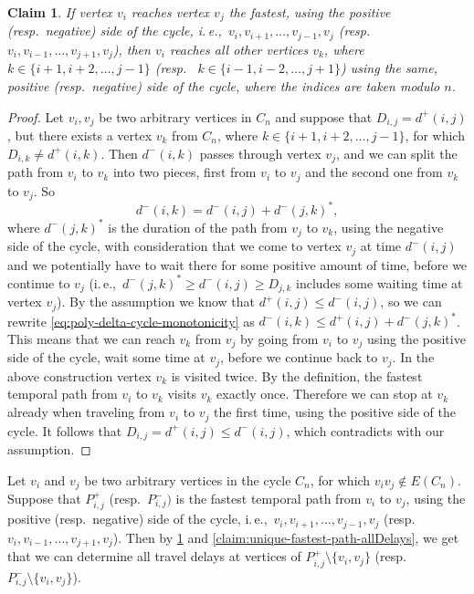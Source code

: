 \documentclass[11pt,a4paper]{article}
\newtheorem{claim}[theorem]{Claim}
\theoremstyle{remark}
\theoremstyle{definition}
\newcommand{\ie}{i.\,e.,\ }
\begin{document}
\begin{claim} \label{claim:poly-delta-cycle-monotonicity}
    If vertex $v_i$ reaches vertex $v_j$ the fastest, using the positive (resp.~negative) side of the cycle, \ie $v_i, v_{i+1}, \dots, v_{j-1}, v_j$ (resp. $v_i, v_{i-1}, \dots, v_{j+1}, v_j$),
    then $v_i$ reaches all other vertices $v_k$, where $k \in \{i+1, i+2, \dots, j-1\}$ (resp.~ $k \in \{i-1, i-2, \dots, j+1\}$)
    using the same, positive (resp.~negative) side of the cycle,
    where the indices are taken modulo $n$.
\end{claim}
\begin{proof}
    Let $v_i, v_j$ be two arbitrary vertices in $C_n$ and suppose that $D_{i,j} = d^+(i,j)$,
    but there exists a vertex $v_k$ from $C_n$, where $k \in \{i+1, i+2, \dots, j-1\}$,
    for which $D_{i,k} \neq d^+(i,k)$.
    Then $d^-(i,k)$ passes through vertex $v_j$, and we can split the path from $v_i$ to $v_k$ into two pieces, 
    first from $v_i$ to $v_j$ and the second one from $v_k$ to $v_j$.
    So 
    \begin{equation} \label{eq:poly-delta-cycle-monotonicity}
        d^-(i,k) = d^-(i,j) + d^-(j,k)^*,
    \end{equation} where $d^-(j,k)^*$ is the duration of the path from $v_j$ to $v_k$, using the negative side of the cycle, with consideration that we come to vertex $v_j$ at time $d^-(i,j)$ and we potentially have to wait there for some positive amount of time, before we continue to $v_j$
    (\ie $d^-(j,k)^* \geq d^-(i,j) \geq D_{j,k}$ includes some waiting time at vertex $v_j$).
    By the assumption we know that $d^+(i,j) \leq d^-(i,j)$, so we can rewrite \cref{eq:poly-delta-cycle-monotonicity} as
    $d^-(i,k) \leq d^+(i,j) + d^-(j,k)^*$. This means that we can reach $v_k$ from $v_j$ by going from $v_i$ to $v_j$ using the positive side of the cycle, wait some time at $v_j$, before we continue back to $v_j$.
    In the above construction vertex $v_k$ is visited twice. By the definition, the fastest temporal path from $v_i$ to $v_k$ visits $v_k$ exactly once. Therefore we can stop at $v_k$ already when traveling from $v_i$ to $v_j$ the first time, using the positive side of the cycle.
    It follows that $D_{i,j} = d^+(i,j) \leq d^-(i,j)$, which contradicts with our assumption.
\end{proof}

Let $v_i$ and $v_j$ be two arbitrary vertices in the cycle $C_n$, for which $v_i v_j \notin E(C_n)$.
Suppose that $P^+_{i,j}$ (resp.~$P^-_{i,j})$ is the fastest temporal path from $v_i$ to $v_j$, using the positive (resp.~negative) side of the cycle, 
\ie $v_i, v_{i+1}, \dots, v_{j-1}, v_j$ (resp. $v_i, v_{i-1}, \dots, v_{j+1}, v_j$).
Then by \cref{claim:poly-delta-cycle-monotonicity} and \cref{claim:unique-fastest-path-allDelays},
we get that we can determine all travel delays at vertices of $P^+_{i,j} \setminus \{v_i, v_j\}$ (resp.~$P^-_{i,j} \setminus \{v_i, v_j\}$).
\end{document}
